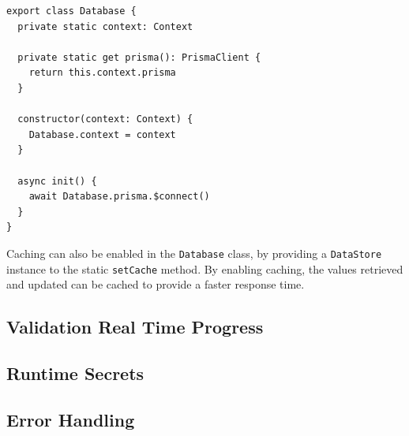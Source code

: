     \begin{lstlisting}[style=es6, caption={ (TypeScript)}]
export class Database {
  private static context: Context

  private static get prisma(): PrismaClient {
    return this.context.prisma
  }

  constructor(context: Context) {
    Database.context = context
  }

  async init() {
    await Database.prisma.$connect()
  }
}
    \end{lstlisting}

    Caching can also be enabled in the \verb;Database; class, by providing a \verb;DataStore; instance to the static \verb;setCache; method. By enabling caching, the values retrieved and updated can be cached to provide a faster response time. 

  \subsection{Validation Real Time Progress}

  \subsection{Runtime Secrets}
    \label{sub:secrets} 

  \subsection{Error Handling}


